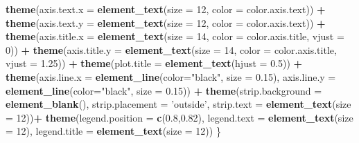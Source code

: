 \documentclass[]{article}
\newenvironment{Shaded}{\begin{snugshade}}{\end{snugshade}}
\newcommand{\KeywordTok}[1]{\textcolor[rgb]{0.13,0.29,0.53}{\textbf{#1}}}
\newcommand{\DataTypeTok}[1]{\textcolor[rgb]{0.13,0.29,0.53}{#1}}
\newcommand{\DecValTok}[1]{\textcolor[rgb]{0.00,0.00,0.81}{#1}}
\newcommand{\FloatTok}[1]{\textcolor[rgb]{0.00,0.00,0.81}{#1}}
\newcommand{\StringTok}[1]{\textcolor[rgb]{0.31,0.60,0.02}{#1}}
\newcommand{\OperatorTok}[1]{\textcolor[rgb]{0.81,0.36,0.00}{\textbf{#1}}}
\newcommand{\NormalTok}[1]{#1}
\begin{document}
\begin{Shaded}
\begin{Highlighting}[]
\StringTok{    }\KeywordTok{theme}\NormalTok{(}\DataTypeTok{axis.text.x =} \KeywordTok{element_text}\NormalTok{(}\DataTypeTok{size =} \DecValTok{12}\NormalTok{, }\DataTypeTok{color =}\NormalTok{ color.axis.text)) }\OperatorTok{+}\StringTok{ }
\StringTok{    }\KeywordTok{theme}\NormalTok{(}\DataTypeTok{axis.text.y =} \KeywordTok{element_text}\NormalTok{(}\DataTypeTok{size =} \DecValTok{12}\NormalTok{, }\DataTypeTok{color =}\NormalTok{ color.axis.text)) }\OperatorTok{+}\StringTok{ }
\StringTok{    }\KeywordTok{theme}\NormalTok{(}\DataTypeTok{axis.title.x =} \KeywordTok{element_text}\NormalTok{(}\DataTypeTok{size =} \DecValTok{14}\NormalTok{, }\DataTypeTok{color =}\NormalTok{ color.axis.title, }\DataTypeTok{vjust =} \DecValTok{0}\NormalTok{)) }\OperatorTok{+}
\StringTok{    }\KeywordTok{theme}\NormalTok{(}\DataTypeTok{axis.title.y =} \KeywordTok{element_text}\NormalTok{(}\DataTypeTok{size =} \DecValTok{14}\NormalTok{, }\DataTypeTok{color =}\NormalTok{ color.axis.title, }\DataTypeTok{vjust =} \FloatTok{1.25}\NormalTok{)) }\OperatorTok{+}
\StringTok{    }\KeywordTok{theme}\NormalTok{(}\DataTypeTok{plot.title =} \KeywordTok{element_text}\NormalTok{(}\DataTypeTok{hjust =} \FloatTok{0.5}\NormalTok{)) }\OperatorTok{+}
\StringTok{    }\KeywordTok{theme}\NormalTok{(}\DataTypeTok{axis.line.x =} \KeywordTok{element_line}\NormalTok{(}\DataTypeTok{color=}\StringTok{"black"}\NormalTok{, }\DataTypeTok{size =} \FloatTok{0.15}\NormalTok{),}
          \DataTypeTok{axis.line.y =} \KeywordTok{element_line}\NormalTok{(}\DataTypeTok{color=}\StringTok{"black"}\NormalTok{, }\DataTypeTok{size =} \FloatTok{0.15}\NormalTok{)) }\OperatorTok{+}
\StringTok{    }\KeywordTok{theme}\NormalTok{(}\DataTypeTok{strip.background =} \KeywordTok{element_blank}\NormalTok{(),}
          \DataTypeTok{strip.placement =} \StringTok{'outside'}\NormalTok{,}
          \DataTypeTok{strip.text =} \KeywordTok{element_text}\NormalTok{(}\DataTypeTok{size =} \DecValTok{12}\NormalTok{))}\OperatorTok{+}
\StringTok{    }\KeywordTok{theme}\NormalTok{(}\DataTypeTok{legend.position =} \KeywordTok{c}\NormalTok{(}\FloatTok{0.8}\NormalTok{,}\FloatTok{0.82}\NormalTok{),}
          \DataTypeTok{legend.text =} \KeywordTok{element_text}\NormalTok{(}\DataTypeTok{size =} \DecValTok{12}\NormalTok{),}
          \DataTypeTok{legend.title =} \KeywordTok{element_text}\NormalTok{(}\DataTypeTok{size =} \DecValTok{12}\NormalTok{))}
\NormalTok{\} }
\end{Highlighting}
\end{Shaded}
\end{document}
